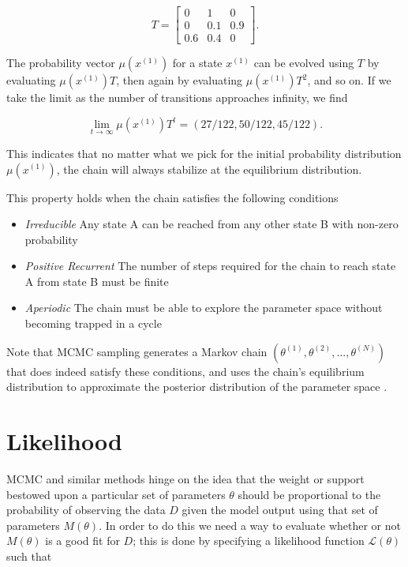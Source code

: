     \begin{equation}
    	T = 
	    \begin{bmatrix}
	        0 & 1 & 0 \\
	        0 & 0.1 & 0.9 \\
	        0.6 & 0.4 & 0
	    \end{bmatrix}.
    \end{equation}

    The probability vector $\mu(x^{(1)})$ for a state $x^{(1)}$ can be evolved using $T$ by evaluating $\mu(x^{(1)})T$, then again by evaluating $\mu(x^{(1)})T^2$, and so on. If we take the limit as the number of transitions approaches infinity, we find

    \begin{equation}
    	\lim_{t \to \infty} \mu(x^{(1)})T^t = (27/122, 50/122, 45/122).
    \end{equation}

    This indicates that no matter what we pick for the initial probability distribution $\mu(x^{(1)})$, the chain will always stabilize at the equilibrium distribution.

    This property holds when the chain satisfies the following conditions

    \begin{itemize}
        \item \textit{Irreducible} Any state A can be reached from any other state B with non-zero probability
        \item \textit{Positive Recurrent} The number of steps required for the chain to reach state A from state B must be finite
        \item \textit{Aperiodic} The chain must be able to explore the parameter space without becoming trapped in a cycle
    \end{itemize}

    Note that MCMC sampling generates a Markov chain $(\theta^{(1)}, \theta^{(2)},..., \theta^{(N)})$ that does indeed satisfy these conditions, and uses the chain's equilibrium distribution to approximate the posterior distribution of the parameter space \cite{Andrieu2003}.    


\section{Likelihood}

    MCMC and similar methods hinge on the idea that the weight or support bestowed upon a particular set of parameters $\theta$ should be proportional to the probability of observing the data $D$ given the model output using that set of parameters $M(\theta)$. In order to do this we need a way to evaluate whether or not $M(\theta)$ is a good fit for $D$; this is done by specifying a likelihood function $\mathcal{L}(\theta)$ such that

